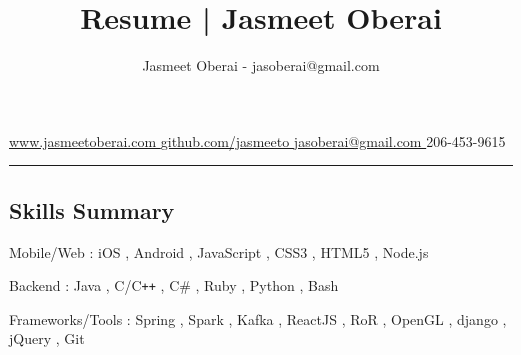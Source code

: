\documentclass[11pt,letterpaper]{article}
\def\labelitemi{\textbf{$\rightarrow$}}
\newcommand{\subsectioncustomend}[1]
{
\vspace{-0.8em}
\subsection*{#1}
}
\newcommand{\subsectioncustom}[1]
{
\hrule
\subsectioncustomend{#1}
}
\newcommand{\CPP}{C\texttt{++}}
\begin{document}
\font=3.0pt


\title{Resume |  Jasmeet Oberai }


\author{Jasmeet Oberai - jasoberai@gmail.com }


\begin{center}
{}


\end{center}


\begin{center}
\Mundus
\hspace{0.1em}
\href{ http://www.jasmeetoberai.com }{
        www.jasmeetoberai.com
} 
        \faGithub*
        \href{ https://github.com/jasmeeto }{
				github.com/jasmeeto
		} 
\Letter
\hspace{0.1em}
\href{mailto:jasoberai@gmail.com }{ jasoberai@gmail.com }
\Mobilefone
\hspace{0.1em}
206-453-9615 
\end{center}


\subsectioncustom{Skills Summary}

\begin{itemize*}
        \item{
            Mobile/Web :
                 iOS
                ,  Android
                ,  JavaScript
                ,  CSS3
                ,  HTML5
                ,  Node.js
        }
        \item{
            Backend :
                 Java
                ,  C/\CPP
                ,  C\#
                ,  Ruby
                ,  Python
                ,  Bash
        }
        \item{
            Frameworks/Tools :
                 Spring
                ,  Spark
                ,  Kafka
                ,  ReactJS
                ,  RoR
                ,  OpenGL
                ,  django
                ,  jQuery
                ,  Git
        }
\end{itemize*}
\end{document}
